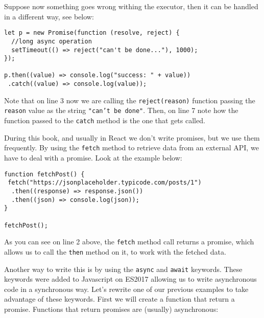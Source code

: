 \documentclass[a4paper, oneside, titlepage, 12pt]{book}
\begin{document}
Suppose now something goes wrong withing the executor, then it can be handled in a different way, see below:

\begin{verbatim}
let p = new Promise(function (resolve, reject) {
  //long async operation
  setTimeout(() => reject("can't be done..."), 1000);
});

p.then((value) => console.log("success: " + value))
 .catch((value) => console.log(value));
\end{verbatim}

Note that on line 3 now we are calling the \texttt{reject(reason)} function passing the \texttt{reason} value as the string \texttt{"can't be done"}. Then, on line 7 note how the function passed to the \texttt{catch} method is the one that gets called.  
\newline

During this book, and usually in React we don't write promises, but we use them frequently. By using the \texttt{fetch} method to retrieve data from an external API, we have to deal with a promise. Look at the example below:

\begin{verbatim}
function fetchPost() {
 fetch("https://jsonplaceholder.typicode.com/posts/1")
  .then((response) => response.json())
  .then((json) => console.log(json));
}

fetchPost();
\end{verbatim}

As you can see on line 2 above, the \texttt{fetch} method call returns a promise, which allows us to call the \texttt{then} method on it, to work with the fetched data.
\newline

Another way to write this is by using the \texttt{async} and \texttt{await} keywords. These keywords were added to Javascript on ES2017 allowing us to write asynchronous code in a synchronous way. Let's rewrite one of our previous examples to take advantage of these keywords. First we will create a function that return a promise. Functions that return promises are (usually) asynchronous:  
\end{document}
